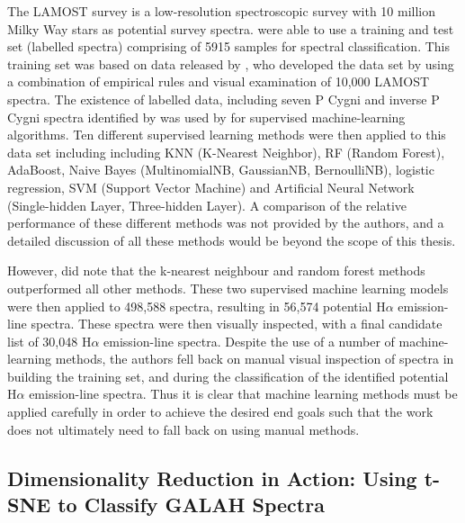 The LAMOST survey is a low-resolution spectroscopic survey with 10 million Milky Way stars as potential survey spectra. \citet{zhang2021catalog} were able to use a training and test set (labelled spectra) comprising of 5915 samples for spectral classification. This training set was based on data released by \citet{hou2016catalog}, who developed the data set by using a combination of empirical rules and visual examination of 10,000 LAMOST spectra. The existence of labelled data, including seven P Cygni and inverse P Cygni spectra identified by \citet{hou2016catalog} was used by \citet{zhang2021catalog} for supervised machine-learning algorithms. Ten different supervised learning methods were then applied to this data set including including KNN (K-Nearest Neighbor), RF (Random Forest), AdaBoost, Naive Bayes (MultinomialNB, GaussianNB, BernoulliNB), logistic regression, SVM (Support Vector Machine) and Artificial Neural Network (Single-hidden Layer, Three-hidden Layer). A comparison of the relative performance of these different methods was not provided by the authors, and a detailed discussion of all these methods would be beyond the scope of this thesis. 

However, \citet{zhang2021catalog} did note that the k-nearest neighbour and random forest methods outperformed all other methods. These two supervised machine learning models were then applied to 498,588 spectra, resulting in 56,574 potential H$\alpha$ emission-line spectra. These spectra were then visually inspected, with a final candidate list of 30,048 H$\alpha$ emission-line spectra. Despite the use of a number of machine-learning methods, the authors fell back on manual visual inspection of spectra in building the training set, and during the classification of the identified potential H$\alpha$ emission-line spectra. Thus it is clear that machine learning methods must be applied carefully in order to achieve the desired end goals such that the work does not ultimately need to fall back on using manual methods.

\subsection{Dimensionality Reduction in Action: Using t-SNE to Classify GALAH Spectra}

